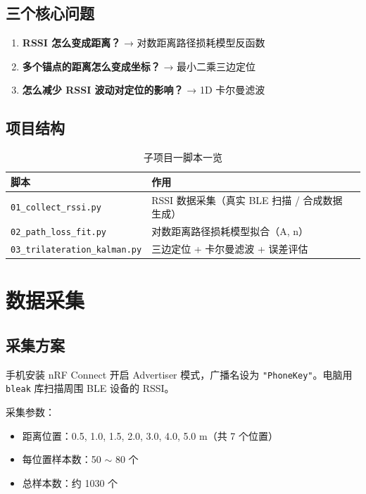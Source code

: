 \documentclass[11pt,a4paper]{article}
\newcommand{\code}[1]{\texttt{#1}}
\begin{document}
\subsection{三个核心问题}

\begin{enumerate}
    \item \textbf{RSSI 怎么变成距离？} → 对数距离路径损耗模型反函数
    \item \textbf{多个锚点的距离怎么变成坐标？} → 最小二乘三边定位
    \item \textbf{怎么减少 RSSI 波动对定位的影响？} → 1D 卡尔曼滤波
\end{enumerate}

\subsection{项目结构}

\begin{table}[H]
\centering
\caption{子项目一脚本一览}
\begin{tabular}{llp{7cm}}
\toprule
\textbf{脚本} & \textbf{作用} \\
\midrule
\code{01\_collect\_rssi.py} & RSSI 数据采集（真实 BLE 扫描 / 合成数据生成） \\
\code{02\_path\_loss\_fit.py} & 对数距离路径损耗模型拟合（A, n） \\
\code{03\_trilateration\_kalman.py} & 三边定位 + 卡尔曼滤波 + 误差评估 \\
\bottomrule
\end{tabular}
\end{table}

\section{数据采集}

\subsection{采集方案}

手机安装 nRF Connect 开启 Advertiser 模式，广播名设为 \texttt{"PhoneKey"}。电脑用 \code{bleak} 库扫描周围 BLE 设备的 RSSI。

采集参数：
\begin{itemize}
    \item 距离位置：0.5, 1.0, 1.5, 2.0, 3.0, 4.0, 5.0 m（共 7 个位置）
    \item 每位置样本数：50 $\sim$ 80 个
    \item 总样本数：约 1030 个
\end{itemize}
\end{document}
